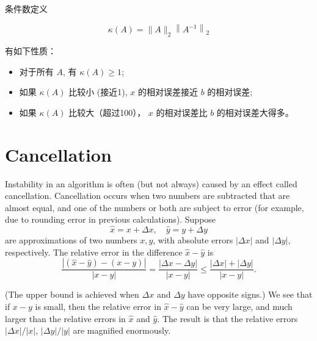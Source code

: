 \begin{definition}        
    条件数定义

    \begin{equation} \kappa(A)=\|A\|_{2}\left\|A^{-1}\right\|_{2} \end{equation}
\end{definition}

\begin{corollary}
    有如下性质：

    \begin{itemize}
        \item 对于所有 $ A $, 有 $ \kappa(A) \geq 1 $;
        \item 如果 $ \kappa(A) $ 比较小 (接近1),  $ x $ 的相对误差接近 $ b $ 的相对误差;
        \item 如果 $ \kappa(A) $ 比较大（超过100），  $ x $ 的相对误差比 $ b $ 的相对误差大得多。 
    \end{itemize}
\end{corollary}



\section{Cancellation}

Instability in an algorithm is often (but not always) caused by an effect called cancellation. Cancellation occurs when two numbers are subtracted that are almost equal, and one of the numbers or both are subject to error (for example, due to rounding error in previous calculations).
Suppose
\begin{equation}
\hat{x}=x+\Delta x, \quad \hat{y}=y+\Delta y
\end{equation}
are approximations of two numbers $ x, y $, with absolute errors $ |\Delta x| $ and $ |\Delta y| $, respectively. The relative error in the difference $ \hat{x}-\hat{y} $ is
\begin{equation}
\frac{|(\hat{x}-\hat{y})-(x-y)|}{|x-y|}=\frac{|\Delta x-\Delta y|}{|x-y|} \leq \frac{|\Delta x|+|\Delta y|}{|x-y|} .
\end{equation}

(The upper bound is achieved when $ \Delta x $ and $ \Delta y $ have opposite signs.) We see that if $ x-y $ is small, then the relative error in $ \hat{x}-\hat{y} $ can be very large, and much larger than the relative errors in $ \hat{x} $ and $ \hat{y} $. The result is that the relative errors $ |\Delta x| /|x| $, $ |\Delta y| /|y| $ are magnified enormously.


